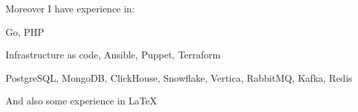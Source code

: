 Moreover I have experience in:
\begin{bulist}
  \item Go, PHP
  \item Infrastructure as code, Ansible, Puppet, Terraform
  \item PostgreSQL, MongoDB, ClickHouse, Snowflake, Vertica, RabbitMQ, Kafka,
    Redis
\end{bulist}
And also some experience in \LaTeX
